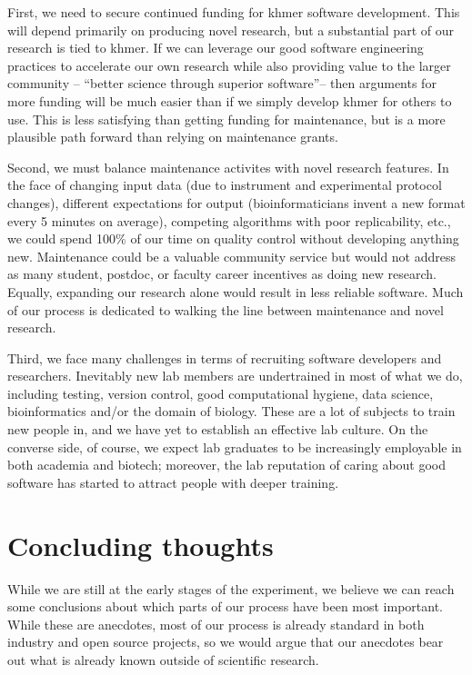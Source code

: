 \documentclass[11pt]{article}
\begin{document}
First, we need to secure continued funding for khmer software
development.  This will depend primarily on producing novel research,
but a substantial part of our research is tied to khmer.  If we can
leverage our good software engineering practices to accelerate our own
research while also providing value to the larger community --
``better science through superior software''-- then arguments for more
funding will be much easier than if we simply develop khmer for
others to use.  This is less satisfying than getting funding for maintenance,
but is a more plausible path forward than relying on maintenance grants.

Second, we must balance maintenance activites with novel research
features.  In the face of changing input data (due to instrument and
experimental protocol changes), different expectations for output
(bioinformaticians invent a new format every 5 minutes on average),
competing algorithms with poor replicability, etc., we could spend
100\% of our time on quality control without developing anything new.
Maintenance could be a valuable community service but would not address
as many student, postdoc, or faculty career incentives as doing new
research.  Equally, expanding our research alone would result in less
reliable software.  Much of our process is dedicated to walking the
line between maintenance and novel research.

Third, we face many challenges in terms of recruiting software
developers and researchers.  Inevitably new lab members are
undertrained in most of what we do, including testing, version
control, good computational hygiene, data science, bioinformatics
and/or the domain of biology.  These are a lot of subjects to train
new people in, and we have yet to establish an effective lab culture.
On the converse side, of course, we expect lab graduates to be
increasingly employable in both academia and biotech; moreover, the
lab reputation of caring about good software has started to attract
people with deeper training.

\section{Concluding thoughts}

While we are still at the early stages of the experiment, we believe
we can reach some conclusions about which parts of our process have
been most important.  While these are anecdotes, most of our process
is already standard in both industry and open source projects, so we
would argue that our anecdotes bear out what is already known outside
of scientific research.
\end{document}
